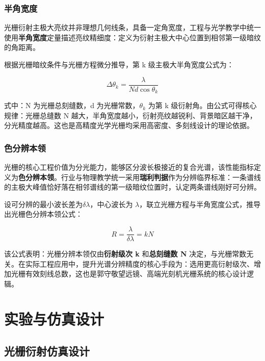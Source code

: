 \documentclass[12pt,a4paper]{ctexrep}
\begin{document}
\subsubsection{半角宽度}

光栅衍射主极大亮纹并非理想几何线条，具备一定角宽度，工程与光学教学中统一使用\textbf{半角宽度}定量描述亮纹精细度：定义为衍射主极大中心位置到相邻第一级暗纹的角距离。

根据光栅暗纹条件与光栅方程微分推导，第 k 级主极大半角宽度公式为：

\begin{equation*}
\Delta\theta_k=\frac{\lambda}{Nd\cos\theta_k}
\end{equation*}

式中：N 为光栅总刻缝数，d 为光栅常数，$\theta_k$ 为第 k 级衍射角。由公式可得核心规律：光栅总缝数 N 越大，半角宽度越小，衍射亮纹越锐利、背景暗区越干净，分光精度越高。这也是高精度光学光栅均采用高密度、多刻线设计的理论依据。

\subsubsection{色分辨本领}

光栅的核心工程价值为分光能力，能够区分波长极接近的复合光谱，该性能指标定义为\textbf{色分辨本领}。行业与物理教学统一采用\textbf{瑞利判据}作为分辨临界标准：一条谱线的主极大峰值恰好落在相邻谱线的第一级暗纹位置时，认定两条谱线刚好可分辨。

设可分辨的最小波长差为$\delta\lambda$，中心波长为 $\lambda$，联立光栅方程与半角宽度公式，推导出光栅色分辨本领公式：

\begin{equation*}
R=\frac{\lambda}{\delta\lambda}=kN
\end{equation*}

该公式表明：光栅分辨本领仅由\textbf{衍射级次 k} 和\textbf{总刻缝数 N} 决定，与光栅常数无关。在实际工程应用中，提升光谱分辨精度的核心手段为：选用更高衍射级次、增加光栅有效刻线总数，这也是郭守敬望远镜、高端光刻机光栅系统的核心设计逻辑。

\section{实验与仿真设计}

\subsection{光栅衍射仿真设计}
\end{document}
